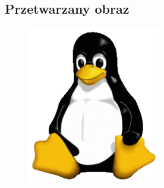 \documentclass[12pt,a4paper]{article}
\begin{document}
\subsection{Przetwarzany obraz}
\begin{figure}[h]
\includegraphics{tux}
\end{figure}
\end{document}
